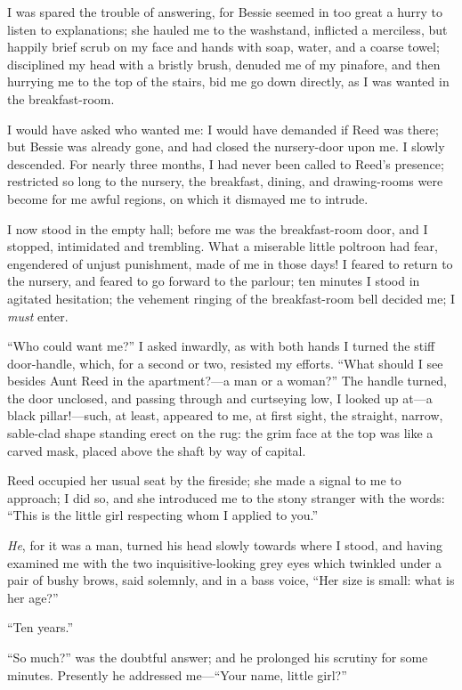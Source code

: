 I was spared the trouble of answering, for Bessie seemed in too great a
hurry to listen to explanations; she hauled me to the washstand,
inflicted a merciless, but happily brief scrub on my face and hands with
soap, water, and a coarse towel; disciplined my head with a bristly
brush, denuded me of my pinafore, and then hurrying me to the top of the
stairs, bid me go down directly, as I was wanted in the breakfast-room.

I would have asked who wanted me: I would have demanded if \Mrs{} Reed was
there; but Bessie was already gone, and had closed the nursery-door upon
me. I slowly descended. For nearly three months, I had never been
called to \Mrs{} Reed's presence; restricted so long to the nursery, the
breakfast, dining, and drawing-rooms were become for me awful regions,
on which it dismayed me to intrude.

I now stood in the empty hall; before me was the breakfast-room door,
and I stopped, intimidated and trembling. What a miserable little
poltroon had fear, engendered of unjust punishment, made of me in those
days! I feared to return to the nursery, and feared to go forward to
the parlour; ten minutes I stood in agitated hesitation; the vehement
ringing of the breakfast-room bell decided me; I \emph{must} enter.

\enquote{Who could want me?} I asked inwardly, as with both hands I
turned the stiff door-handle, which, for a second or two, resisted my
efforts. \enquote{What should I see besides Aunt Reed in the
	apartment?---a man or a woman?} The handle turned, the door unclosed,
and passing through and curtseying low, I looked up at---a black
pillar!---such, at least, appeared to me, at first sight, the straight,
narrow, sable-clad shape standing erect on the rug: the grim face at the
top was like a carved mask, placed above the shaft by way of capital.

\Mrs{} Reed occupied her usual seat by the fireside; she made a signal to
me to approach; I did so, and she introduced me to the stony stranger
with the words: \enquote{This is the little girl respecting whom I
	applied to you.}

\emph{He}, for it was a man, turned his head slowly towards where I
stood, and having examined me with the two inquisitive-looking grey eyes
which twinkled under a pair of bushy brows, said solemnly, and in a bass
voice, \enquote{Her size is small: what is her age?}

\enquote{Ten years.}

\enquote{So much?} was the doubtful answer; and he prolonged his
scrutiny for some minutes. Presently he addressed me---\enquote{Your
	name, little girl?}

